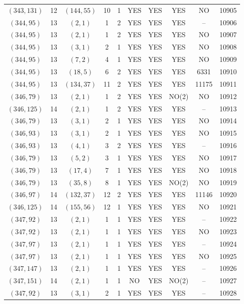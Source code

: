 \begin{longtable}{|c|c|c|c|c|c|c|c|c|c|}
$(343, 131)$ & 12 & $(144, 55)$ & 10 & 1 & YES & YES & YES & NO & 10905\\
$(344, 95)$ & 13 & $(2, 1)$ & 1 & 2 & YES & YES & YES & -- & 10906\\
$(344, 95)$ & 13 & $(2, 1)$ & 1 & 2 & YES & YES & YES & NO & 10907\\
$(344, 95)$ & 13 & $(3, 1)$ & 2 & 1 & YES & YES & YES & NO & 10908\\
$(344, 95)$ & 13 & $(7, 2)$ & 4 & 1 & YES & YES & YES & NO & 10909\\
$(344, 95)$ & 13 & $(18, 5)$ & 6 & 2 & YES & YES & YES & 6331 & 10910\\
$(344, 95)$ & 13 & $(134, 37)$ & 11 & 2 & YES & YES & YES & 11175 & 10911\\
$(346, 79)$ & 13 & $(2, 1)$ & 1 & 2 & YES & YES & NO(2) & NO & 10912\\
$(346, 125)$ & 14 & $(2, 1)$ & 1 & 2 & YES & YES & YES & -- & 10913\\
$(346, 79)$ & 13 & $(3, 1)$ & 2 & 1 & YES & YES & YES & NO & 10914\\
$(346, 93)$ & 13 & $(3, 1)$ & 2 & 1 & YES & YES & YES & NO & 10915\\
$(346, 93)$ & 13 & $(4, 1)$ & 3 & 2 & YES & YES & YES & -- & 10916\\
$(346, 79)$ & 13 & $(5, 2)$ & 3 & 1 & YES & YES & YES & NO & 10917\\
$(346, 79)$ & 13 & $(17, 4)$ & 7 & 1 & YES & YES & YES & NO & 10918\\
$(346, 79)$ & 13 & $(35, 8)$ & 8 & 1 & YES & YES & NO(2) & NO & 10919\\
$(346, 97)$ & 14 & $(132, 37)$ & 12 & 2 & YES & YES & YES & 11146 & 10920\\
$(346, 125)$ & 14 & $(155, 56)$ & 12 & 1 & YES & YES & YES & NO & 10921\\
$(347, 92)$ & 13 & $(2, 1)$ & 1 & 1 & YES & YES & YES & -- & 10922\\
$(347, 92)$ & 13 & $(2, 1)$ & 1 & 1 & YES & YES & YES & NO & 10923\\
$(347, 97)$ & 13 & $(2, 1)$ & 1 & 1 & YES & YES & YES & -- & 10924\\
$(347, 97)$ & 13 & $(2, 1)$ & 1 & 1 & YES & YES & YES & NO & 10925\\
$(347, 147)$ & 13 & $(2, 1)$ & 1 & 1 & YES & YES & YES & -- & 10926\\
$(347, 151)$ & 14 & $(2, 1)$ & 1 & 1 & NO & YES & NO(2) & -- & 10927\\
$(347, 92)$ & 13 & $(3, 1)$ & 2 & 1 & YES & YES & YES & -- & 10928\\

\end{longtable}
